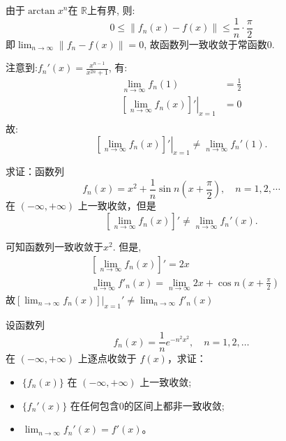 \begin{solution}
    由于\(\arctan x^{n}\)在 \(\mathbb{R}\)上有界, 则:
    \[
        0 \le  \left\lVert f_{n}(x) - f(x) \right\rVert \le
        \frac{1}{n} \cdot \frac{\pi}{2}
    \]
    即\(\lim_{n \to \infty} \left\lVert f_{n} - f(x) \right\rVert =
    0\), 故函数列一致收敛于常函数\(0\).

    注意到:\(f_{n}'(x) = \frac{x^{n - 1}}{x^{2n} + 1}\), 有:
    \begin{align*}
        \lim_{n \to \infty} f_{n}(1) & = \frac{1}{2} \\
        \left. \left[ \lim_{n \to \infty} f_{n}(x) \right]'
        \right|_{x=1}                & = 0           \\
    \end{align*}
    故: \[
        \left. \left[ \lim_{n \to \infty} f_n(x) \right]' \right|_{x = 1}
        \neq \lim_{n \to \infty} f_n'(1).
    \]
\end{solution}

\begin{problem}
    求证：函数列
    \[
        f_n(x) = x^2 + \frac{1}{n} \sin n \left( x + \frac{\pi}{2}
        \right), \quad n = 1, 2, \cdots
    \]
    在 \((-\infty, +\infty)\) 上一致收敛，但是
    \[
        \left[ \lim_{n \to \infty} f_n(x) \right]' \neq \lim_{n \to
        \infty} f_n'(x).
    \]
\end{problem}

\begin{solution}
    可知函数列一致收敛于\(x^{2}\).
    但是,
    \begin{align*}
        & \left[ \lim_{n \to \infty} f_{n}(x) \right]' = 2x        \\
        & \lim_{n \to \infty} f'_{n}(x) = \lim_{n \to \infty} 2x +
        \cos n \left( x + \frac{\pi}{2} \right)
    \end{align*}
    故\(\left.\left[ \lim_{n \to \infty} f_n(x) \right]\right|_{x=1}'
        \neq \lim_{n \to
    \infty} f'_{n}(x)\)
\end{solution}

\begin{problem}
    设函数列
    \[
        f_n(x) = \frac{1}{n} e^{-n^2 x^2}, \quad n = 1, 2, \ldots
    \]
    在 \((-\infty, +\infty)\) 上逐点收敛于 \(f(x)\)，求证：
    \begin{itemize}
        \item \(\{f_n(x)\}\) 在 \((-\infty, +\infty)\) 上一致收敛;
        \item \(\{f_n'(x)\}\) 在任何包含0的区间上都非一致收敛;
        \item \(\lim_{n \to \infty} f_n'(x) = f'(x)\)。
    \end{itemize}
\end{problem}

